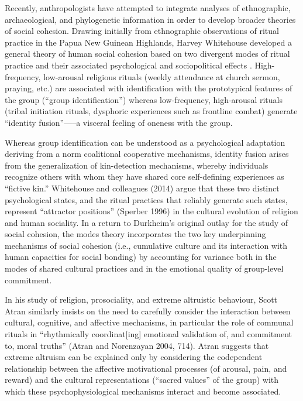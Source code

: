 Recently, anthropologists have attempted to integrate analyses of ethnographic, archaeological, and phylogenetic information in order to develop broader theories of social cohesion. Drawing initially from ethnographic observations of ritual practice in the Papua New Guinean Highlands, Harvey Whitehouse developed a general theory of human social cohesion based on two divergent modes of ritual practice and their associated psychological and sociopolitical effects \citep{Whitehouse1996}. High-frequency, low-arousal religious rituals (weekly attendance at church sermon, praying, etc.) are associated with identification with the prototypical features of the group (“group identification”) whereas low-frequency, high-arousal rituals (tribal initiation rituals, dysphoric experiences such as frontline combat) generate “identity fusion”—--a visceral feeling of oneness with the group.

Whereas group identification can be understood as a psychological adaptation deriving from a norm coalitional cooperative mechanisms, identity fusion arises from the generalization of kin-detection mechanisms, whereby individuals recognize others with whom they have shared core self-defining experiences as ``fictive kin.'' Whitehouse and colleagues (2014) argue that these two distinct psychological states, and the ritual practices that reliably generate such states, represent ``attractor positions'' (Sperber 1996) in the cultural evolution of religion and human sociality. In a return to Durkheim’s original outlay for the study of social cohesion, the modes theory incorporates the two key underpinning mechanisms of social cohesion (i.e., cumulative culture and its interaction with human capacities for social bonding) by accounting for variance both in the modes of shared cultural practices and in the emotional quality of group-level commitment.

In his study of religion, prosociality, and extreme altruistic behaviour, Scott Atran similarly insists on the need to carefully consider the interaction between cultural, cognitive, and affective mechanisms, in particular the role of communal rituals in “rhythmically coordinat[ing] emotional validation of, and commitment to, moral truths” (Atran and Norenzayan 2004, 714). Atran suggests that extreme altruism can be explained only by considering the codependent relationship between the affective motivational processes (of arousal, pain, and reward) and the cultural representations (“sacred values” of the group) with which these psychophysiological mechanisms interact and become associated.


